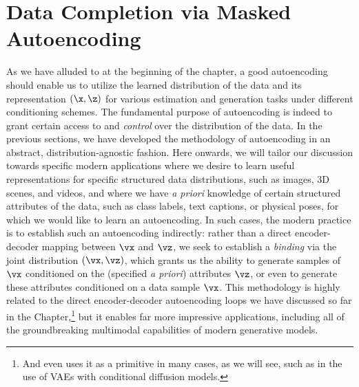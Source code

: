 \documentclass[../../book-main.tex]{subfiles}
\begin{document}
\section{Data Completion via Masked Autoencoding}
\label{sec:MAE}
As we have alluded to at the beginning of the chapter, a good autoencoding should enable us to utilize the learned distribution of the data and its representation $(\x,\z)$ for various
estimation and generation tasks under different conditioning schemes.
The fundamental purpose of autoencoding is indeed to grant certain access to and \textit{control} over the distribution of the data. In the previous sections, we have developed the methodology of autoencoding in an abstract,
distribution-agnostic fashion. Here onwards, we will tailor our discussion
towards specific modern applications where we desire to learn useful
representations for specific structured data distributions, such as images, 3D
scenes, and videos, and where we have \textit{a priori} knowledge of certain
structured attributes of the data, such as class labels, text captions, or
physical poses, for which we would like to learn an autoencoding. In such cases, the modern practice is to establish such an autoencoding indirectly: rather than a direct encoder-decoder mapping between $\vx$ and $\vz$, we seek to establish a \textit{binding} via the joint distribution $(\vx, \vz)$, which grants us the ability to generate samples of $\vx$ conditioned on
the (specified \textit{a priori}) attributes $\vz$, or even to generate these
attributes conditioned on a data sample $\vx$. This methodology is highly
related to the direct encoder-decoder autoencoding loops we have discussed so
far in the Chapter,\footnote{And even uses it as a primitive in many cases, as
we will see, such as in the use of VAEs with conditional diffusion models.} but
it enables far more impressive applications, including all of the groundbreaking
multimodal capabilities of modern generative models.
\end{document}

